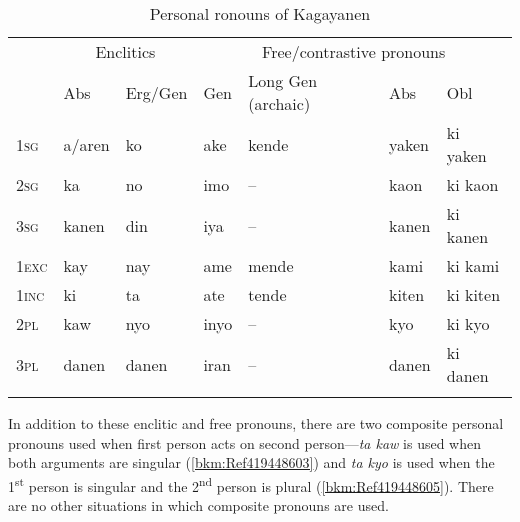 \begin{table}
\caption{Personal ronouns of Kagayanen}
\label{tab:personalpronouns}
\begin{tabularx}{\textwidth}{>{\scshape}llX llll}
\lsptoprule
& \multicolumn{2}{c}{Enclitics} &  \multicolumn{4}{c}{Free/contrastive pronouns} \\
\cmidrule(r){1-3}\cmidrule(l){4-7}
& Abs & Erg/Gen & Gen & Long Gen (archaic) & Abs & Obl \\
\midrule
1sg & a/aren\footnotemark & ko & ake & kende & yaken & ki yaken \\
2sg & ka & no & imo & {}-- & kaon & ki kaon \\
3sg & kanen & din & iya & {}-- & kanen & ki kanen \\
1exc & kay & nay & ame & mende & kami & ki kami \\
1inc & ki & ta & ate & tende & kiten & ki kiten \\
2pl & kaw & nyo & inyo & {}-- & kyo & ki kyo \\
3pl & danen\footnotemark & danen & iran & {}-- & danen & ki danen \\
\lspbottomrule
\end{tabularx}
\end{table}
In addition to these enclitic and free pronouns, there are two composite personal pronouns used when first person acts on second person---\textit{ta kaw} is used when both arguments are singular (\ref{bkm:Ref419448603}) and \textit{ta kyo} is used when the 1\textsuperscript{st} person is singular and the 2\textsuperscript{nd} person is plural (\ref{bkm:Ref419448605}). There are no other situations in which composite pronouns are used.

